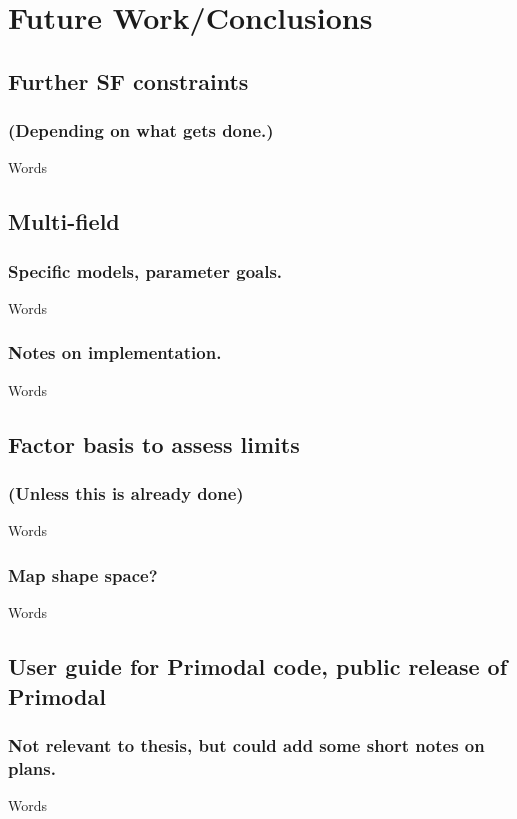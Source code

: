 \chapter{Future Work/Conclusions}
\section{Further SF constraints}
    \subsection{(Depending on what gets done.)}
    Words
\section{Multi-field}
    \subsection{Specific models, parameter goals.}
    Words
    \subsection{Notes on implementation.}
    Words
\section{Factor basis to assess limits}
    \subsection{(Unless this is already done)}
    Words
    \subsection{Map shape space?}
    Words
\section{User guide for Primodal code, public release of Primodal}
    \subsection{Not relevant to thesis, but could add some short notes on plans.}
    Words

